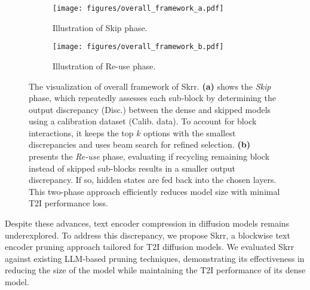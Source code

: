 \begin{figure*}[!t]
  \centering
  \begin{subfigure}{0.49\linewidth}
    \texttt{[image: figures/overall\_framework\_a.pdf]}
    \caption{Illustration of Skip phase.}
    \label{fig:overall_framework_skip}
  \end{subfigure}
  \hfill
  \begin{subfigure}{0.49\linewidth}
    \texttt{[image: figures/overall\_framework\_b.pdf]}
    \caption{Illustration of Re-use phase.}
    \label{fig:overall_framework_reuse}
  \end{subfigure}
  \vspace{-1em}
  \caption{
The visualization of overall framework of Skrr. \textbf{(a)} shows the \textit{Skip} phase, which repeatedly assesses each sub-block by determining the output discrepancy (Disc.) between the dense and skipped models using a calibration dataset (Calib. data). To account for block interactions, it keeps the top $k$ options with the smallest discrepancies and uses beam search for refined selection. \textbf{(b)} presents the \textit{Re-use} phase, evaluating if recycling remaining block instead of skipped sub-blocks results in a smaller output discrepancy. If so, hidden states are fed back into the chosen layers. This two-phase approach efficiently reduces model size with minimal T2I performance loss.}
  \label{fig:overall_framework}
\vspace{-1em}
\end{figure*}

Despite these advances, text encoder compression in diffusion models remains underexplored. To address this discrepancy, we propose Skrr, a blockwise text encoder pruning approach tailored for T2I diffusion models. We evaluated Skrr against existing LLM-based pruning techniques, demonstrating its effectiveness in reducing the size of the model while maintaining the T2I performance of its dense model.